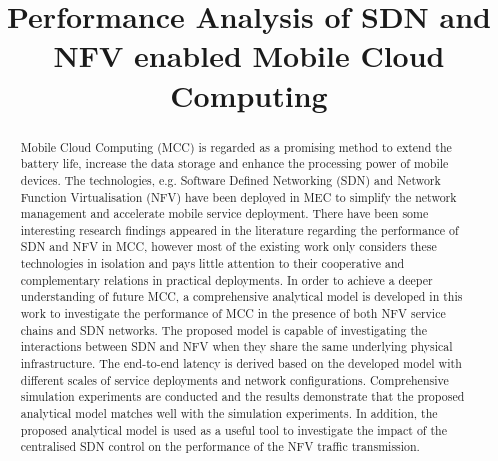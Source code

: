 \documentclass[conference]{IEEEtran}
\begin{document}
\title{Performance Analysis of SDN and NFV enabled Mobile Cloud Computing}

\author{
}
 
\maketitle

\begin{abstract}
Mobile Cloud Computing (MCC) is regarded as a promising method to extend the battery life, increase the data storage and enhance the processing power of mobile devices. The technologies, e.g. Software Defined Networking (SDN) and Network Function Virtualisation (NFV) have been deployed in MEC to simplify the network management and accelerate mobile service deployment. There have been some interesting research findings appeared in the literature regarding the performance of SDN and NFV in MCC, however most of the existing work only considers these technologies in isolation and pays little attention to their cooperative and complementary relations in practical deployments.  In order to achieve a deeper understanding of future MCC, a comprehensive analytical model is developed in this work to investigate the performance of MCC in the presence of both NFV service chains and SDN networks. The proposed model is capable of investigating the interactions between SDN and NFV when they share the same underlying physical infrastructure. The end-to-end latency is derived based on the developed model with different scales of service deployments and network configurations. Comprehensive simulation experiments are conducted and the results demonstrate that the proposed analytical model matches well with the simulation experiments. In addition, the proposed analytical model is used as a useful tool to investigate the impact of the centralised SDN control on the performance of the NFV traffic transmission. 
\end{abstract}










% 





\end{document}

